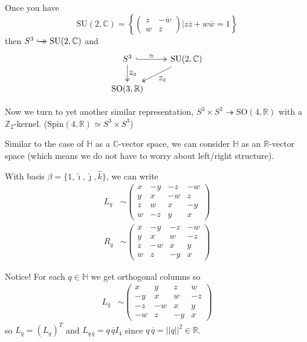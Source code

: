 \documentclass[12pt]{article}
\renewcommand{\hat}[1]{\widehat{#1}}
\newcommand{\R}{\mathbb{R}}
\newcommand{\Z}{\mathbb{Z}}
\newcommand{\C}{\mathbb{C}}
\renewcommand{\H}{\mathbb{H}}
\newcommand{\norm}[1]{\left\vert \left\vert #1 \right\vert \right\vert}
\newcommand{\SO}{\text{SO}}
\newcommand{\SU}{\text{SU}}
\newcommand{\biject}{\hookrightarrow \hspace{-8pt} \rightarrow}
\newcommand{\ihat}{\hat{\imath}}
\newcommand{\jhat}{\hat{\jmath}}
\newcommand{\khat}{\hat{k}}
\renewcommand{\bar}{\overline}
\begin{document}
    Once you have 
    \[\SU(2, \C) = \left\{\begin{pmatrix}
        z & -\bar w\\ 
        w & \bar z
    \end{pmatrix} \bigg\vert z\bar z + w\bar w = 1\right\}\]
    then $S^3 \biject \SU(2, \C)$ and 
    \[\begin{tikzcd}
        S^3 \arrow[hook, two heads]{r}{\simeq} \arrow[two heads]{d}{\Z_2} & \SU(2, \C) \arrow[two heads]{dl}{\Z_2}\\
        \SO(3, \R) &
    \end{tikzcd}\]

    Now we turn to yet another similar representation, $S^3 \times S^3 \twoheadrightarrow \SO(4, \R)$ with a $\Z_2$-kernel. ($\text{Spin}(4, \R) \simeq S^3 \times S^3$) 

    Similar to the case of $\H$ as a $\C$-vector space, we can consider $\H$ as an $\R$-vector space (which means we do not have to worry about left/right structure). 

    With basis $\beta = \{1, \ihat, \jhat, \khat\}$, we can write
    \begin{align*}
        L_q &\sim \begin{pmatrix}
            x & -y & -z & -w\\ 
            y & x & -w & z\\
            z & w & x & -y\\
            w & -z & y & x
        \end{pmatrix}\\ 
        R_q &\sim \begin{pmatrix}
            x & -y & -z & -w\\ 
            y & x & w & -z\\
            z & -w & x & y\\
            w & z & -y & x
        \end{pmatrix}
    \end{align*}

    Notice! For each $q \in \H$ we get orthogonal columns so 
    \begin{align*}
        L_{\bar q} &\sim \begin{pmatrix}
            x & y & z & w\\ 
            -y & x & w & -z\\
            -z & -w & x & y\\
            -w & z & -y & x
        \end{pmatrix}
    \end{align*}
    so $L_{\bar q} = (L_q)^T$ and $L_{q\,\bar q} = q\,\bar qI_4$ since $q\, \bar q = \norm{q}^2 \in \R$. 
\end{document}
